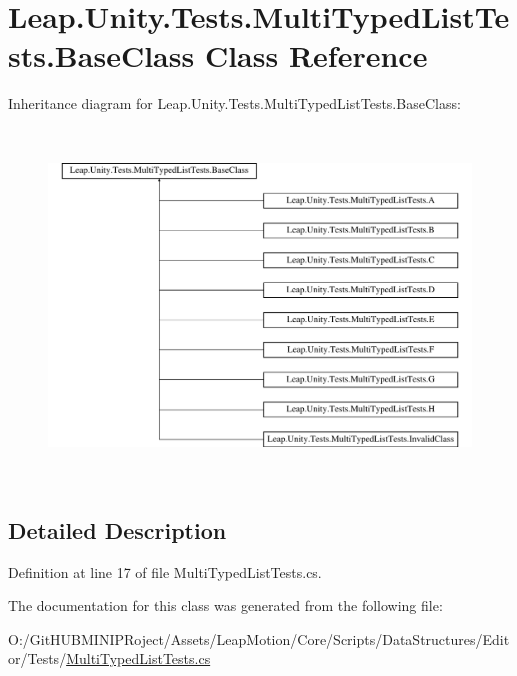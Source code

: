 \hypertarget{class_leap_1_1_unity_1_1_tests_1_1_multi_typed_list_tests_1_1_base_class}{}\section{Leap.\+Unity.\+Tests.\+Multi\+Typed\+List\+Tests.\+Base\+Class Class Reference}
\label{class_leap_1_1_unity_1_1_tests_1_1_multi_typed_list_tests_1_1_base_class}
Inheritance diagram for Leap.\+Unity.\+Tests.\+Multi\+Typed\+List\+Tests.\+Base\+Class\+:\begin{figure}[H]
\begin{center}
\leavevmode
\includegraphics[height=9.364549cm]{class_leap_1_1_unity_1_1_tests_1_1_multi_typed_list_tests_1_1_base_class}
\end{center}
\end{figure}


\subsection{Detailed Description}


Definition at line 17 of file Multi\+Typed\+List\+Tests.\+cs.



The documentation for this class was generated from the following file\+:\begin{DoxyCompactItemize}
\item 
O\+:/\+Git\+H\+U\+B\+M\+I\+N\+I\+P\+Roject/\+Assets/\+Leap\+Motion/\+Core/\+Scripts/\+Data\+Structures/\+Editor/\+Tests/\mbox{\hyperlink{_multi_typed_list_tests_8cs}{Multi\+Typed\+List\+Tests.\+cs}}\end{DoxyCompactItemize}
